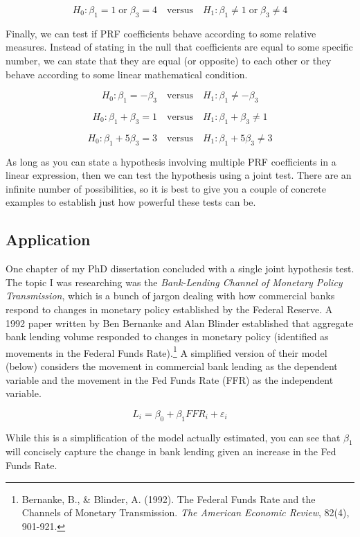 \documentclass[
]{book}
\begin{document}
\[H_0: \beta_1 = 1 \; \text{or} \; \beta_3 = 4 \quad \text{versus} \quad H_1: \beta_1 \neq 1\; \text{or} \; \beta_3 \neq 4\]

Finally, we can test if PRF coefficients behave according to some relative measures. Instead of stating in the null that coefficients are equal to some specific number, we can state that they are equal (or opposite) to each other or they behave according to some linear mathematical condition.

\[H_0: \beta_1 = -\beta_3 \quad \text{versus} \quad H_1: \beta_1 \neq -\beta_3\]

\[H_0: \beta_1 + \beta_3 = 1 \quad \text{versus} \quad H_1: \beta_1 + \beta_3 \neq 1\]

\[H_0: \beta_1 + 5\beta_3 = 3 \quad \text{versus} \quad H_1: \beta_1 + 5\beta_3 \neq 3\]

As long as you can state a hypothesis involving multiple PRF coefficients in a linear expression, then we can test the hypothesis using a joint test. There are an infinite number of possibilities, so it is best to give you a couple of concrete examples to establish just how powerful these tests can be.

\subsection*{Application}\label{application-7}

One chapter of my PhD dissertation concluded with a single joint hypothesis test. The topic I was researching was the \emph{Bank-Lending Channel of Monetary Policy Transmission}, which is a bunch of jargon dealing with how commercial banks respond to changes in monetary policy established by the Federal Reserve. A 1992 paper written by Ben Bernanke and Alan Blinder established that aggregate bank lending volume responded to changes in monetary policy (identified as movements in the Federal Funds Rate).\footnote{Bernanke, B., \& Blinder, A. (1992). The Federal Funds Rate and the Channels of Monetary Transmission. \emph{The American Economic Review}, 82(4), 901-921.} A simplified version of their model (below) considers the movement in commercial bank lending as the dependent variable and the movement in the Fed Funds Rate (FFR) as the independent variable.

\[L_i = \beta_0 + \beta_1 FFR_i + \varepsilon_i\]

While this is a simplification of the model actually estimated, you can see that \(\beta_1\) will concisely capture the change in bank lending given an increase in the Fed Funds Rate.
\end{document}
